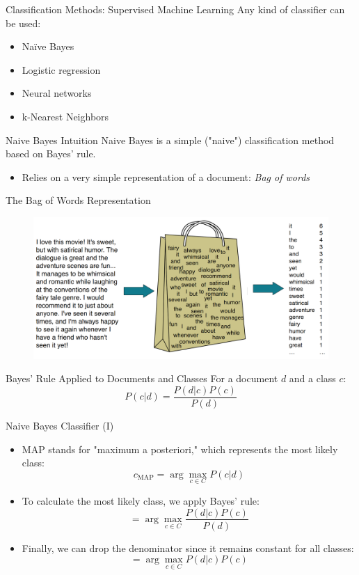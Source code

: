 \documentclass[handout]{beamer}
\begin{document}
\begin{frame}{Classification Methods: Supervised Machine Learning}
    Any kind of classifier can be used:
    \begin{itemize}
        \item Naïve Bayes
        \item Logistic regression
        \item Neural networks
        \item k-Nearest Neighbors
    \end{itemize}
\end{frame}

\begin{frame}{Naive Bayes Intuition}
    Naive Bayes is a simple ("naive") classification method based on Bayes' rule.
    \begin{itemize}
        \item Relies on a very simple representation of a document: \textit{Bag of words}
    \end{itemize}
\end{frame}

\begin{frame}{The Bag of Words Representation}

\begin{figure}[h]
\includegraphics[scale = 0.22]{pics/bow.png}
\end{figure}


\end{frame}

\begin{frame}{Bayes' Rule Applied to Documents and Classes}
    For a document $d$ and a class $c$:
    \[
    P(c | d) = \frac{P(d | c)P(c)}{P(d)}
    \]
\end{frame}

\begin{frame}{Naive Bayes Classifier (I)}
\scriptsize
\begin{itemize}
    \item MAP stands for "maximum a posteriori," which represents the most likely class:
    \[
    c_{\text{MAP}} = \arg\max_{c \in C} P(c | d)
    \]
    \item To calculate the most likely class, we apply Bayes' rule:
    \[
    = \arg\max_{c \in C} \frac{P(d | c)P(c)}{P(d)}
    \]
    \item Finally, we can drop the denominator since it remains constant for all classes:
    \[
    = \arg\max_{c \in C} P(d | c)P(c)
    \]
\end{itemize}
\end{frame}
\end{document}
